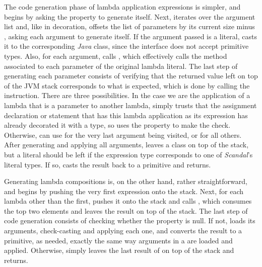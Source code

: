 The code generation phase of lambda application expressions is simpler, and begins by asking the  property to generate itself. Next,  iterates over the argument list and, like in decoration, offsets the list of parameters by its current size minus , asking each argument to generate itself. If the argument passed is a literal,  casts it to the corresponding \emph{Java} class, since the  interface does not accept primitive types. Also, for each argument,  calls , which effectively calls the method associated to each parameter of the original lambda literal. The last step of generating each parameter consists of verifying that the returned value left on top of the JVM stack corresponds to what is expected, which is done by calling the  instruction. There are three possibilities. In the case we are the application of a lambda that is a parameter to another lambda,  simply trusts that the assignment declaration or statement that has this lambda application as its expression has already decorated it with a type, so  uses the  property to make the check. Otherwise,  can use  for the very last argument being visited, or  for all others. After generating and applying all arguments,  leaves a  class on top of the stack, but a literal should be left if the expression type corresponds to one of \emph{Scandal}'s literal types. If so,  casts the result back to a primitive and returns.

Generating lambda compositions is, on the other hand, rather straightforward, and begins by pushing the very first expression onto the stack. Next, for each lambda other than the first,  pushes it onto the stack and calls , which consumes the top two elements and leaves the result on top of the stack. The last step of code generation consists of checking whether the  property is null. If not,  loads its arguments, check-casting and applying each one, and converts the result to a primitive, as needed, exactly the same way arguments in a  are loaded and applied. Otherwise,  simply leaves the last result of  on top of the stack and returns.